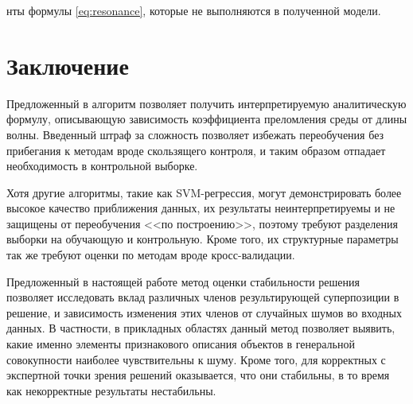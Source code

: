 \documentclass[12pt,a4paper]{article}
\begin{document}
нты формулы \eqref{eq:resonance},
которые не выполняются в полученной модели.

\section{Заключение}

Предложенный в \cite{Rudoy13} алгоритм позволяет получить интерпретируемую аналитическую
формулу, описывающую зависимость коэффициента преломления среды от длины волны.
Введенный штраф за сложность позволяет избежать переобучения без прибегания к методам
вроде скользящего контроля, и таким образом отпадает необходимость в контрольной выборке.

Хотя другие алгоритмы, такие как SVM-регрессия, могут демонстрировать более высокое
качество приближения данных, их результаты неинтерпретируемы и не защищены от переобучения
<<по построению>>, поэтому требуют разделения выборки на обучающую и контрольную. Кроме
того, их структурные параметры так же требуют оценки по методам вроде кросс-валидации.

Предложенный в настоящей работе метод оценки стабильности решения позволяет исследовать вклад различных
членов результирующей суперпозиции в решение, и зависимость изменения этих членов от
случайных шумов во входных данных. В частности, в прикладных областях данный метод позволяет
выявить, какие именно элементы признакового описания объектов в генеральной совокупности
наиболее чувствительны к шуму. Кроме того, для корректных с экспертной точки зрения
решений оказывается, что они стабильны, в то время как некорректные результаты нестабильны.

\FloatBarrier


%
%

\end{document}
